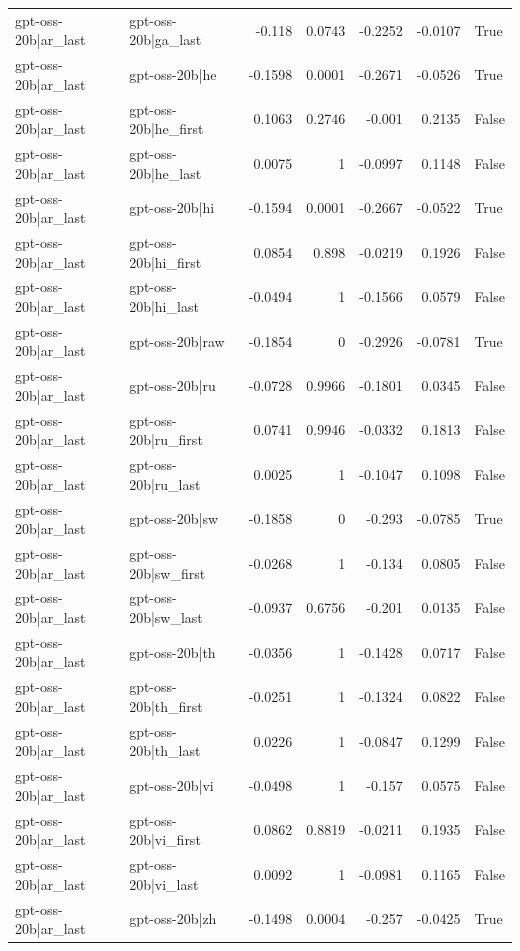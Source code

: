 \begin{table}
\begin{tabular}{l l r r r r l}
gpt-oss-20b|ar_last & gpt-oss-20b|ga_last & -0.118 & 0.0743 & -0.2252 & -0.0107 & True \\
gpt-oss-20b|ar_last & gpt-oss-20b|he & -0.1598 & 0.0001 & -0.2671 & -0.0526 & True \\
gpt-oss-20b|ar_last & gpt-oss-20b|he_first & 0.1063 & 0.2746 & -0.001 & 0.2135 & False \\
gpt-oss-20b|ar_last & gpt-oss-20b|he_last & 0.0075 & 1 & -0.0997 & 0.1148 & False \\
gpt-oss-20b|ar_last & gpt-oss-20b|hi & -0.1594 & 0.0001 & -0.2667 & -0.0522 & True \\
gpt-oss-20b|ar_last & gpt-oss-20b|hi_first & 0.0854 & 0.898 & -0.0219 & 0.1926 & False \\
gpt-oss-20b|ar_last & gpt-oss-20b|hi_last & -0.0494 & 1 & -0.1566 & 0.0579 & False \\
gpt-oss-20b|ar_last & gpt-oss-20b|raw & -0.1854 & 0 & -0.2926 & -0.0781 & True \\
gpt-oss-20b|ar_last & gpt-oss-20b|ru & -0.0728 & 0.9966 & -0.1801 & 0.0345 & False \\
gpt-oss-20b|ar_last & gpt-oss-20b|ru_first & 0.0741 & 0.9946 & -0.0332 & 0.1813 & False \\
gpt-oss-20b|ar_last & gpt-oss-20b|ru_last & 0.0025 & 1 & -0.1047 & 0.1098 & False \\
gpt-oss-20b|ar_last & gpt-oss-20b|sw & -0.1858 & 0 & -0.293 & -0.0785 & True \\
gpt-oss-20b|ar_last & gpt-oss-20b|sw_first & -0.0268 & 1 & -0.134 & 0.0805 & False \\
gpt-oss-20b|ar_last & gpt-oss-20b|sw_last & -0.0937 & 0.6756 & -0.201 & 0.0135 & False \\
gpt-oss-20b|ar_last & gpt-oss-20b|th & -0.0356 & 1 & -0.1428 & 0.0717 & False \\
gpt-oss-20b|ar_last & gpt-oss-20b|th_first & -0.0251 & 1 & -0.1324 & 0.0822 & False \\
gpt-oss-20b|ar_last & gpt-oss-20b|th_last & 0.0226 & 1 & -0.0847 & 0.1299 & False \\
gpt-oss-20b|ar_last & gpt-oss-20b|vi & -0.0498 & 1 & -0.157 & 0.0575 & False \\
gpt-oss-20b|ar_last & gpt-oss-20b|vi_first & 0.0862 & 0.8819 & -0.0211 & 0.1935 & False \\
gpt-oss-20b|ar_last & gpt-oss-20b|vi_last & 0.0092 & 1 & -0.0981 & 0.1165 & False \\
gpt-oss-20b|ar_last & gpt-oss-20b|zh & -0.1498 & 0.0004 & -0.257 & -0.0425 & True \\

\end{tabular}
\end{table}
